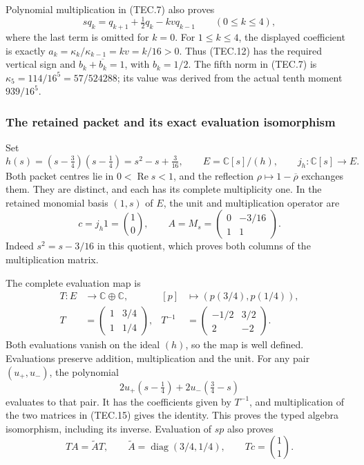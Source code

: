 Polynomial multiplication in (TEC.7) also proves
\[
 s q_k=q_{k+1}+\tfrac12q_k-kv q_{k-1}
       \qquad(0\leq k\leq4),                                   \tag{TEC.12}
\]
where the last term is omitted for \(k=0\).  For \(1\leq k\leq4\),
the displayed coefficient is exactly
\(a_k=\kappa_k/\kappa_{k-1}=kv=k/16>0\).
Thus (TEC.12) has the required vertical sign and
\(b_k+\overline{b_k}=1\), with \(b_k=1/2\).
The fifth norm in (TEC.7) is
\(\kappa_5=114/16^5=57/524288\); its value was derived from the
actual tenth moment \(939/16^5\).

\subsubsection{The retained packet and its exact evaluation isomorphism}

Set
\[
 h(s)=(s-\tfrac34)(s-\tfrac14)=s^2-s+\tfrac3{16},\qquad
 E=\mathbb C[s]/(h),\qquad j_h:\mathbb C[s]\longrightarrow E.
                                                                    \tag{TEC.13}
\]
Both packet centres lie in \(0<\operatorname{Re}s<1\), and the
reflection \(\rho\mapsto1-\overline\rho\) exchanges them.  They are
distinct, and each has its complete multiplicity one.  In the retained
monomial basis \((1,s)\) of \(E\), the unit and multiplication operator
are
\[
 c=j_h1=\binom10,\qquad
 A=M_s=\begin{pmatrix}0&-3/16\\1&1\end{pmatrix}.                 \tag{TEC.14}
\]
Indeed \(s^2=s-3/16\) in this quotient, which proves both columns
of the multiplication matrix.

The complete evaluation map is
\[
\begin{aligned}
 T:E&\longrightarrow\mathbb C\oplus\mathbb C,&
 [p]&\longmapsto(p(3/4),p(1/4)),\\
 T&=\begin{pmatrix}1&3/4\\1&1/4\end{pmatrix},&
 T^{-1}&=\begin{pmatrix}-1/2&3/2\\2&-2\end{pmatrix}.
\end{aligned}                                                     \tag{TEC.15}
\]
Both evaluations vanish on the ideal \((h)\), so the map is well
defined.  Evaluations preserve addition, multiplication and the unit.
For any pair \((u_+,u_-)\), the polynomial
\[
 2u_+(s-\tfrac14)+2u_-(\tfrac34-s)                               \tag{TEC.16}
\]
evaluates to that pair.  It has the coefficients given by
\(T^{-1}\), and multiplication of the two matrices in (TEC.15)
gives the identity.  This proves the typed algebra isomorphism,
including its inverse.  Evaluation of \(s p\) also proves
\[
 TA=\widetilde A T,\qquad
 \widetilde A=\operatorname{diag}(3/4,1/4),\qquad
 Tc=\binom11.                                                    \tag{TEC.17}
\]

